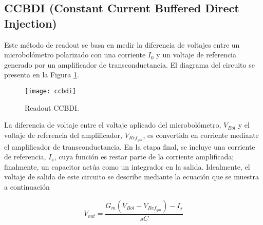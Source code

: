 \newpage
\subsection{CCBDI (Constant Current Buffered Direct Injection)}
Este método de readout se basa en medir la diferencia de voltajes entre un microbolómetro polarizado con una corriente $I_{0}$ y un voltaje de referencia generado por un amplificador de transconductancia. El diagrama del circuito se presenta en la Figura \ref{fig:ccbdi}.
            \begin{figure}[hbtp]
                \centering
                \texttt{[image: ccbdi]}
                \caption{Readout CCBDI.}
                \label{fig:ccbdi}
            \end{figure}

La diferencia de voltaje entre el voltaje aplicado del microbolómetro, $V_{Bol}$ y el voltaje de referencia del amplificador, $V_{Ref_{gm}}$, es convertida en corriente mediante el amplificador de transconductancia. En la etapa final, se incluye una corriente de referencia, $I_{s}$, cuya función es restar parte de la corriente amplificada; finalmente, un capacitor actúa como un integrador en la salida. Idealmente, el voltaje de salida de este circuito se describe mediante la ecuación que se muestra a continuación

        \begin{equation}
        V_{out} = \frac{G_{m}(V_{Bol}-V_{Ref_{gm}})-I_{s}}{sC}
        \label{eq:ccbdi}
        \end{equation}